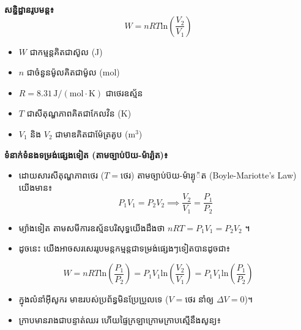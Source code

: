 \textbf{សន្និដ្ឋានរូបមន្ត៖}
\begin{equation}
	W = nRT \mbox{ln}\left(\frac{V_2}{V_1}\right)
\end{equation}
\begin{itemize}
	\item $W$ ជាកម្មន្តគិតជាស៊ូល (J)
	\item $n$ ជាចំនួនម៉ូលគិតជាម៉ូល (mol)
	\item $R = 8.31\,\mathrm{J/(mol\cdot K)}$ ជាថេរឧស្ម័ន
	\item $T$ ជាសីតុណ្ហភាពគិតជាកែលវិន (K)
	\item $V_1$ និង $V_2$ ជាមាឌគិតជាម៉ែត្រគូប ($\mathrm{m}^3$)
\end{itemize}
\textbf{ទំនាក់ទំនងទម្រង់ផ្សេងទៀត (តាមច្បាប់ប៊យ-ម៉ារ្យ៉ត)៖}
\begin{itemize}
	\item ដោយសារសីតុណ្ហភាពថេរ ($T = \mbox{ថេរ}$) តាមច្បាប់ប៊យ-ម៉ារ្យុ៉ត (Boyle-Mariotte's Law) យើងមាន៖
	\begin{equation*}
		P_1 V_1 = P_2 V_2 \implies \frac{V_2}{V_1} = \frac{P_1}{P_2}
	\end{equation*}
	\item ម្យ៉ាងទៀត តាមសមីការឧស្ម័នបរិសុទ្ធយើងដឹងថា $nRT = P_1 V_1 = P_2 V_2$ ។
	\item ដូចនេះ យើងអាចសរសេររូបមន្តកម្មន្តជាទម្រង់ផ្សេងៗទៀតបានដូចជា៖
\end{itemize}
\begin{equation}
																W = nRT \mbox{ln}\left(\frac{P_1}{P_2}\right) = P_1 V_1 \mbox{ln}\left(\frac{V_2}{V_1}\right) = P_1 V_1 \mbox{ln}\left(\frac{P_1}{P_2}\right)
\end{equation}
	
\begin{itemize}
	\item ក្នុងលំនាំអ៊ីសូករ មាឌរបស់ប្រព័ន្ធមិនប្រែប្រួលទេ ($V = \mbox{ថេរ}$ នាំឲ្យ $\Delta V = 0$)។
	\item ក្រាបមានរាងជាបន្ទាត់ឈរ ហើយផ្ទៃក្រឡាក្រោមក្រាបស្មើនឹងសូន្យ៖
\end{itemize}

